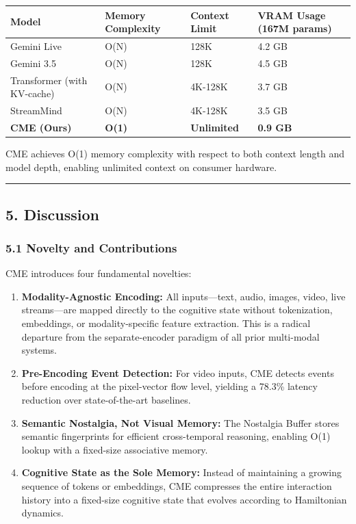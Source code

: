 \documentclass[
  11pt,
  a4paper,
]{article}
\begin{document}
\begin{longtable}[]{@{}llll@{}}
\toprule\noalign{}
Model & Memory Complexity & Context Limit & VRAM Usage (167M params) \\
\midrule\noalign{}
\endhead
\bottomrule\noalign{}
\endlastfoot
Gemini Live & O(N) & 128K & 4.2 GB \\
Gemini 3.5 & O(N) & 128K & 4.5 GB \\
Transformer (with KV-cache) & O(N) & 4K-128K & 3.7 GB \\
StreamMind & O(N) & 4K-128K & 3.5 GB \\
\textbf{CME (Ours)} & \textbf{O(1)} & \textbf{Unlimited} & \textbf{0.9
GB} \\
\end{longtable}

CME achieves O(1) memory complexity with respect to both context length
and model depth, enabling unlimited context on consumer hardware.

\begin{center}\rule{0.5\linewidth}{0.5pt}\end{center}

\subsection{5. Discussion}\label{discussion}

\subsubsection{5.1 Novelty and
Contributions}\label{novelty-and-contributions}

CME introduces four fundamental novelties:

\begin{enumerate}
\def\labelenumi{\arabic{enumi}.}
\item
  \textbf{Modality-Agnostic Encoding:} All inputs---text, audio, images,
  video, live streams---are mapped directly to the cognitive state
  without tokenization, embeddings, or modality-specific feature
  extraction. This is a radical departure from the separate-encoder
  paradigm of all prior multi-modal systems.
\item
  \textbf{Pre-Encoding Event Detection:} For video inputs, CME detects
  events before encoding at the pixel-vector flow level, yielding a
  78.3\% latency reduction over state-of-the-art baselines.
\item
  \textbf{Semantic Nostalgia, Not Visual Memory:} The Nostalgia Buffer
  stores semantic fingerprints for efficient cross-temporal reasoning,
  enabling O(1) lookup with a fixed-size associative memory.
\item
  \textbf{Cognitive State as the Sole Memory:} Instead of maintaining a
  growing sequence of tokens or embeddings, CME compresses the entire
  interaction history into a fixed-size cognitive state that evolves
  according to Hamiltonian dynamics.
\end{enumerate}
\end{document}

